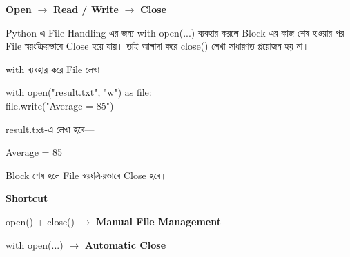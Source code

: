 \begin{center}
\textbf{Open}
\(\longrightarrow\)
\textbf{Read / Write}
\(\longrightarrow\)
\textbf{Close}
\end{center}



Python-এ File Handling-এর জন্য
\textenglish{\ttfamily with open(...)} ব্যবহার করলে Block-এর কাজ শেষ
হওয়ার পর File স্বয়ংক্রিয়ভাবে Close হয়ে যায়। তাই আলাদা করে
\textenglish{\ttfamily close()} লেখা সাধারণত প্রয়োজন হয় না।

\begin{codeoutputbox}{\textenglish{\ttfamily with} ব্যবহার করে File লেখা}
\noindent
\begin{minipage}[t]{0.55\linewidth}
\vspace{0pt}
\codeheading
\begin{english}
\ttfamily
with open("result.txt", "w") as file:\\
\hspace*{4mm}file.write("Average = 85")
\end{english}
\end{minipage}
\hfill
\begin{minipage}[t]{0.41\linewidth}
\vspace{0pt}
\outputheading

\textenglish{\ttfamily result.txt}-এ লেখা হবে—

\begin{center}
\textenglish{\ttfamily Average = 85}
\end{center}

Block শেষ হলে File স্বয়ংক্রিয়ভাবে Close হবে।
\end{minipage}
\end{codeoutputbox}

\begin{rememberbox}
\textbf{\color{deepOrange}Shortcut}

\begin{center}
\textenglish{\ttfamily open() + close()}
\(\longrightarrow\)
\textbf{Manual File Management}

\medskip

\textenglish{\ttfamily with open(...)}
\(\longrightarrow\)
\textbf{Automatic Close}
\end{center}
\end{rememberbox}

